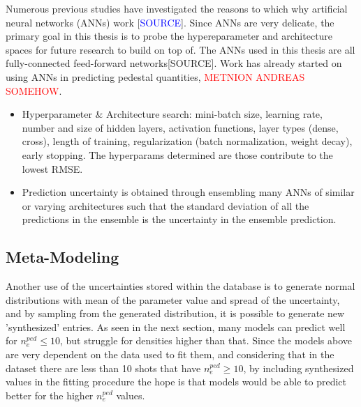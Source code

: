 \documentclass[a4paper, twoside, final, 12pt]{article}
\begin{document}
Numerous previous studies have investigated the reasons to which why artificial neural networks (ANNs) work [\textcolor{blue}{SOURCE}].
Since ANNs are very delicate, the primary goal in this thesis is to probe the hypereparameter and architecture spaces for future research to build on top of.
The ANNs used in this thesis are all fully-connected feed-forward networks[SOURCE].
Work has already started on using ANNs in predicting pedestal quantities, \textcolor{red}{METNION ANDREAS SOMEHOW}.
\begin{itemize}
	\item Hyperparameter \& Architecture search: mini-batch size, learning rate,  number and size of hidden layers, activation functions, layer types (dense, cross), length of training, regularization (batch normalization, weight decay), early stopping. The hyperparams determined are those contribute to the lowest RMSE.
	\item Prediction uncertainty is obtained through ensembling many ANNs of similar or varying architectures such that the standard deviation of all the predictions in the ensemble is the uncertainty in the ensemble prediction.
\end{itemize}



\subsection{Meta-Modeling}
Another use of the uncertainties stored within the database is to generate normal distributions with mean of the parameter value and spread of the uncertainty, and by sampling from the generated distribution, it is possible to generate new 'synthesized' entries.
As seen in the next section, many models can predict well for $n_e^{ped} \leq 10$, but struggle for densities higher than that.
Since the models above are very dependent on the data used to fit them, and considering that in the dataset there are less than 10 shots that have $n_e^{ped} \geq 10$, by including synthesized values in the fitting procedure the hope is that models would be able to predict better for the higher $n_e^{ped}$ values.
\end{document}
